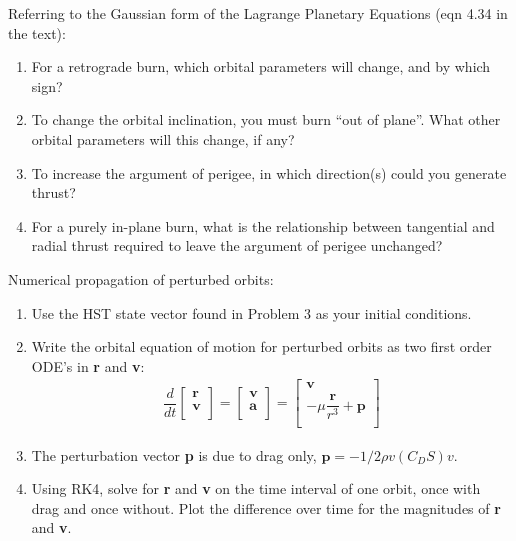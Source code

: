 \documentclass[onecolumn,10pt]{jhwhw}
\begin{document}
\problem{}
Referring to the Gaussian form of the Lagrange Planetary Equations (eqn 4.34 in the text):
\begin{enumerate}
\item For a retrograde burn, which orbital parameters will change, and by which sign?
\item To change the orbital inclination, you must burn ``out of plane''. What other orbital parameters will this change, if any?
\item To increase the argument of perigee, in which direction(s) could you generate thrust?
\item For a purely in-plane burn, what is the relationship between tangential and radial thrust required to leave the argument of perigee unchanged?
\end{enumerate}

\problem{}
Numerical propagation of perturbed orbits:
\begin{enumerate}
\item Use the HST state vector found in Problem 3 as your initial conditions.
\item Write the orbital equation of motion for perturbed orbits as two first order ODE’s in \textbf{r} and \textbf{v}:
\begin{align*}
\dfrac{d}{dt} \begin{bmatrix}
          \textbf{r} \\
          \textbf{v} \\
        \end{bmatrix}
  = \begin{bmatrix}
          \textbf{v} \\
          \textbf{a} \\
        \end{bmatrix}
  = \begin{bmatrix}
          \textbf{v} \\
          -\mu \dfrac{\textbf{r}}{r^3} + \textbf{p} \\
        \end{bmatrix}
\end{align*}
\item The perturbation vector \textbf{p} is due to drag only, $\textbf{p} = -1/2 \rho v(C_D S)v$.
\item Using RK4, solve for \textbf{r} and \textbf{v} on the time interval of one orbit, once with drag and once without. Plot the
difference over time for the magnitudes of \textbf{r} and \textbf{v}.
\end{enumerate}



% 
\end{document}
